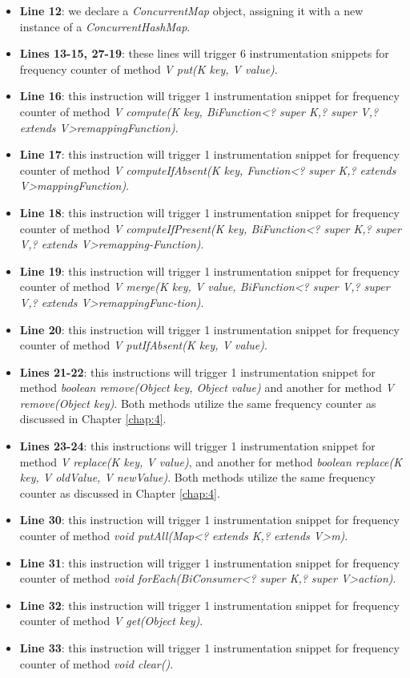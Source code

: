 \documentclass[]{usiinfthesis}
\begin{document}
\begin{itemize}
    \item \textbf{Line 12}: we declare a \textit{ConcurrentMap} object, assigning it with a new instance of a \textit{ConcurrentHashMap}.
    \item \textbf{Lines 13-15, 27-19}: these lines will trigger 6 instrumentation snippets for frequency counter of method \textit{V put(K key, V value)}.
    \item \textbf{Line 16}: this instruction will trigger 1 instrumentation snippet for frequency counter of method \textit{V compute(K key, BiFunction<? super K,? super V,? extends V>remappingFunction)}.
    \item \textbf{Line 17}: this instruction will trigger 1 instrumentation snippet for frequency counter of method \textit{V computeIfAbsent(K key, Function<? super K,? extends V>mappingFunction)}.
    \item \textbf{Line 18}: this instruction will trigger 1 instrumentation snippet for frequency counter of method \textit{V computeIfPresent(K key, BiFunction<?  super K,?  super V,?  extends V>remapping-Function)}.
    \item \textbf{Line 19}: this instruction will trigger 1 instrumentation snippet for frequency counter of method \textit{V merge(K key, V value, BiFunction<?  super V,?  super V,?  extends V>remappingFunc-tion)}.
    \item \textbf{Line 20}: this instruction will trigger 1 instrumentation snippet for frequency counter of method \textit{V putIfAbsent(K key, V value)}.
    \item \textbf{Lines 21-22}: this instructions will trigger 1 instrumentation snippet for method \textit{boolean remove(Object key, Object value)} and another for method \textit{V remove(Object key)}. Both methods utilize the same frequency counter as discussed in Chapter \ref{chap:4}. 
    \item \textbf{Lines 23-24}: this instructions will trigger 1 instrumentation snippet for method \textit{V replace(K key, V value)}, and another for method \textit{boolean replace(K key, V oldValue, V newValue)}. Both methods utilize the same frequency counter as discussed in Chapter \ref{chap:4}.
    \item \textbf{Line 30}: this instruction will trigger 1 instrumentation snippet for frequency counter of method \textit{void putAll(Map<? extends K,? extends V>m)}.
    \item \textbf{Line 31}: this instruction will trigger 1 instrumentation snippet for frequency counter of method \textit{void forEach(BiConsumer<? super K,? super V>action)}.
    \item \textbf{Line 32}: this instruction will trigger 1 instrumentation snippet for frequency counter of method \textit{V get(Object key)}.
    \item \textbf{Line 33}: this instruction will trigger 1 instrumentation snippet for frequency counter of method \textit{void clear()}.
\end{itemize}
\end{document}
